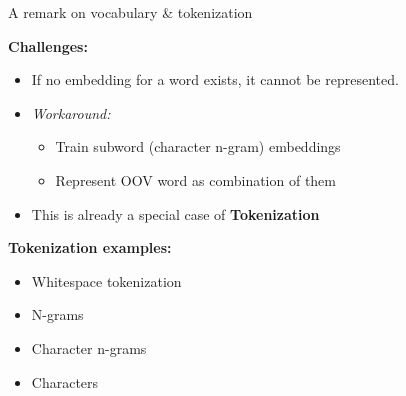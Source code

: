 \documentclass[]{beamer}
\begin{document}
\begin{frame}{A remark on vocabulary \& tokenization}

	\textbf{Challenges:}

	\begin{itemize}
		\item If no embedding for a word exists, it cannot be represented.
		\item \textit{Workaround:}\\
			\begin{itemize}
				\item Train subword (character n-gram) embeddings
				\item Represent OOV word as combination of them
			\end{itemize}
		\item This is already a special case of \textbf{Tokenization}
	\end{itemize}
	
	\vspace{.3cm}
	
	\textbf{Tokenization examples:}
	
	\begin{itemize}
		\item Whitespace tokenization
		\item N-grams
		\item Character n-grams
		\item Characters
	\end{itemize}
\end{frame}
\end{document}
